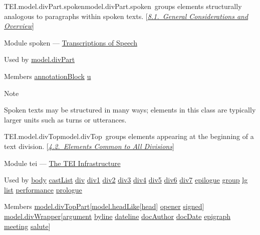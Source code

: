 \begin{reflist}
\item[]\begin{specHead}{TEI.model.divPart.spoken}{model.divPart.spoken} groups elements structurally analogous to paragraphs within spoken texts. [\textit{\hyperref[TSOV]{8.1.\ General Considerations and Overview}}]\end{specHead} 
    \item[{Module}]
  spoken — \hyperref[TS]{Transcriptions of Speech}
    \item[{Used by}]
  \hyperref[TEI.model.divPart]{model.divPart}
    \item[{Members}]
  \hyperref[TEI.annotationBlock]{annotationBlock} \hyperref[TEI.u]{u}
    \item[{Note}]
  \par
Spoken texts may be structured in many ways; elements in this class are typically larger units such as turns or utterances. 
\end{reflist}  
\begin{reflist}
\item[]\begin{specHead}{TEI.model.divTop}{model.divTop} groups elements appearing at the beginning of a text division. [\textit{\hyperref[DSDTB]{4.2.\ Elements Common to All Divisions}}]\end{specHead} 
    \item[{Module}]
  tei — \hyperref[ST]{The TEI Infrastructure}
    \item[{Used by}]
  \hyperref[TEI.body]{body} \hyperref[TEI.castList]{castList} \hyperref[TEI.div]{div} \hyperref[TEI.div1]{div1} \hyperref[TEI.div2]{div2} \hyperref[TEI.div3]{div3} \hyperref[TEI.div4]{div4} \hyperref[TEI.div5]{div5} \hyperref[TEI.div6]{div6} \hyperref[TEI.div7]{div7} \hyperref[TEI.epilogue]{epilogue} \hyperref[TEI.group]{group} \hyperref[TEI.lg]{lg} \hyperref[TEI.list]{list} \hyperref[TEI.performance]{performance} \hyperref[TEI.prologue]{prologue}
    \item[{Members}]
  \hyperref[TEI.model.divTopPart]{model.divTopPart}[\hyperref[TEI.model.headLike]{model.headLike}[\hyperref[TEI.head]{head}] \hyperref[TEI.opener]{opener} \hyperref[TEI.signed]{signed}] \hyperref[TEI.model.divWrapper]{model.divWrapper}[\hyperref[TEI.argument]{argument} \hyperref[TEI.byline]{byline} \hyperref[TEI.dateline]{dateline} \hyperref[TEI.docAuthor]{docAuthor} \hyperref[TEI.docDate]{docDate} \hyperref[TEI.epigraph]{epigraph} \hyperref[TEI.meeting]{meeting} \hyperref[TEI.salute]{salute}]
\end{reflist}  

